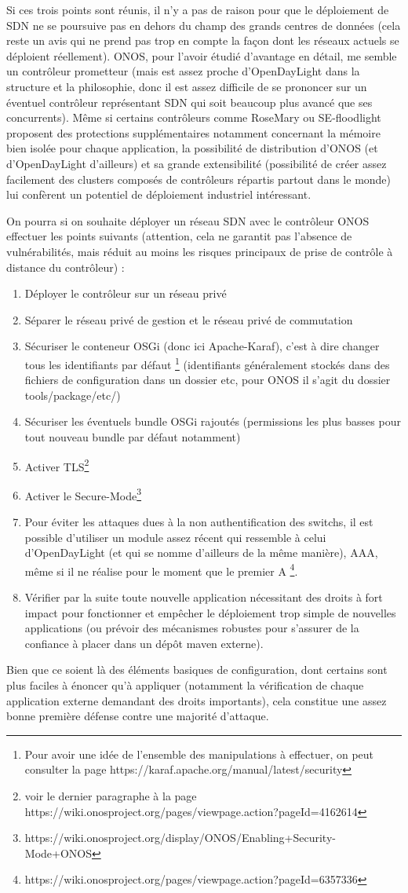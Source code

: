 Si ces trois points sont réunis, il n'y a pas de raison pour que le déploiement de SDN ne se poursuive pas en dehors du champ des grands centres de données (cela reste un avis qui ne prend pas trop en compte la façon dont les réseaux actuels se déploient réellement). ONOS, pour l'avoir étudié d'avantage en détail, me semble un contrôleur prometteur (mais est assez proche d'OpenDayLight dans la structure et la philosophie, donc il est assez difficile de se prononcer sur un éventuel contrôleur représentant SDN qui soit beaucoup plus avancé que ses concurrents). Même si certains contrôleurs comme RoseMary ou SE-floodlight proposent des protections supplémentaires notamment concernant la mémoire bien isolée pour chaque application, la possibilité de distribution d'ONOS (et d'OpenDayLight d'ailleurs) et sa grande extensibilité (possibilité de créer assez facilement des clusters composés de contrôleurs répartis partout dans le monde) lui confèrent un potentiel de déploiement industriel intéressant. 

On pourra si on souhaite déployer un réseau SDN avec le contrôleur ONOS effectuer les points suivants (attention, cela ne garantit pas l'absence de vulnérabilités, mais réduit au moins les risques principaux de prise de contrôle à distance du contrôleur) :
\begin{enumerate}
\item Déployer le contrôleur sur un réseau privé
\item Séparer le réseau privé de gestion et le réseau privé de commutation
\item Sécuriser le conteneur OSGi (donc ici Apache-Karaf), c'est à dire changer tous les identifiants par défaut \footnote{Pour avoir une idée de l'ensemble des manipulations à effectuer, on peut consulter la page https://karaf.apache.org/manual/latest/security} (identifiants généralement stockés dans des fichiers de configuration dans un dossier etc, pour ONOS il s'agit du dossier tools/package/etc/) 
\item Sécuriser les éventuels bundle OSGi rajoutés (permissions les plus basses pour tout nouveau bundle par défaut notamment)
\item Activer TLS\footnote{voir le dernier paragraphe à la page https://wiki.onosproject.org/pages/viewpage.action?pageId=4162614}
\item Activer le Secure-Mode\footnote{https://wiki.onosproject.org/display/ONOS/Enabling+Security-Mode+ONOS}
\item Pour éviter les attaques dues à la non authentification des switchs, il est possible d'utiliser un module assez récent qui ressemble à celui d'OpenDayLight (et qui se nomme d'ailleurs de la même manière), AAA, même si il ne réalise pour le moment que le premier A \footnote{https://wiki.onosproject.org/pages/viewpage.action?pageId=6357336}.
\item Vérifier par la suite toute nouvelle application nécessitant des droits à fort impact pour fonctionner et empêcher le déploiement trop simple de nouvelles applications (ou prévoir des mécanismes robustes pour s'assurer de la confiance à placer dans un dépôt maven externe).
\end{enumerate}

Bien que ce soient là des éléments basiques de configuration, dont certains sont plus faciles à énoncer qu'à appliquer (notamment la vérification de chaque application externe demandant des droits importants), cela constitue une assez bonne première défense contre une majorité d'attaque.
